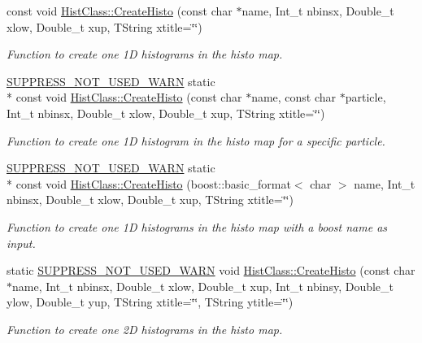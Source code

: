 \begin{DoxyCompactItemize}
const void \hyperlink{namespaceHistClass_ae4e9eec6f288b9e7e29575249bd720ae}{Hist\-Class\-::\-Create\-Histo} (const char $\ast$name, Int\-\_\-t nbinsx, Double\-\_\-t xlow, Double\-\_\-t xup, T\-String xtitle=\char`\"{}\char`\"{})
\begin{DoxyCompactList}\small\item\em Function to create one 1\-D histograms in the histo map. \end{DoxyCompactList}\item 
\hyperlink{HistClass_8hh_a85edd6ac47f5ea2970c76af20855738c}{S\-U\-P\-P\-R\-E\-S\-S\-\_\-\-N\-O\-T\-\_\-\-U\-S\-E\-D\-\_\-\-W\-A\-R\-N} static \\*
const void \hyperlink{namespaceHistClass_a291085c6bad7504d919689f5849c8bb9}{Hist\-Class\-::\-Create\-Histo} (const char $\ast$name, const char $\ast$particle, Int\-\_\-t nbinsx, Double\-\_\-t xlow, Double\-\_\-t xup, T\-String xtitle=\char`\"{}\char`\"{})
\begin{DoxyCompactList}\small\item\em Function to create one 1\-D histogram in the histo map for a specific particle. \end{DoxyCompactList}\item 
\hyperlink{HistClass_8hh_a85edd6ac47f5ea2970c76af20855738c}{S\-U\-P\-P\-R\-E\-S\-S\-\_\-\-N\-O\-T\-\_\-\-U\-S\-E\-D\-\_\-\-W\-A\-R\-N} static \\*
const void \hyperlink{namespaceHistClass_a4565ce8b0fdab8fa7c3e61a78eb470e1}{Hist\-Class\-::\-Create\-Histo} (boost\-::basic\-\_\-format$<$ char $>$ name, Int\-\_\-t nbinsx, Double\-\_\-t xlow, Double\-\_\-t xup, T\-String xtitle=\char`\"{}\char`\"{})
\begin{DoxyCompactList}\small\item\em Function to create one 1\-D histograms in the histo map with a boost name as input. \end{DoxyCompactList}\item 
static \hyperlink{HistClass_8hh_a85edd6ac47f5ea2970c76af20855738c}{S\-U\-P\-P\-R\-E\-S\-S\-\_\-\-N\-O\-T\-\_\-\-U\-S\-E\-D\-\_\-\-W\-A\-R\-N} void \hyperlink{namespaceHistClass_acc4b0ea574224d49b1aa9b1f4ae0facb}{Hist\-Class\-::\-Create\-Histo} (const char $\ast$name, Int\-\_\-t nbinsx, Double\-\_\-t xlow, Double\-\_\-t xup, Int\-\_\-t nbinsy, Double\-\_\-t ylow, Double\-\_\-t yup, T\-String xtitle=\char`\"{}\char`\"{}, T\-String ytitle=\char`\"{}\char`\"{})
\begin{DoxyCompactList}\small\item\em Function to create one 2\-D histograms in the histo map. \end{DoxyCompactList}\item 

\end{DoxyCompactItemize}
